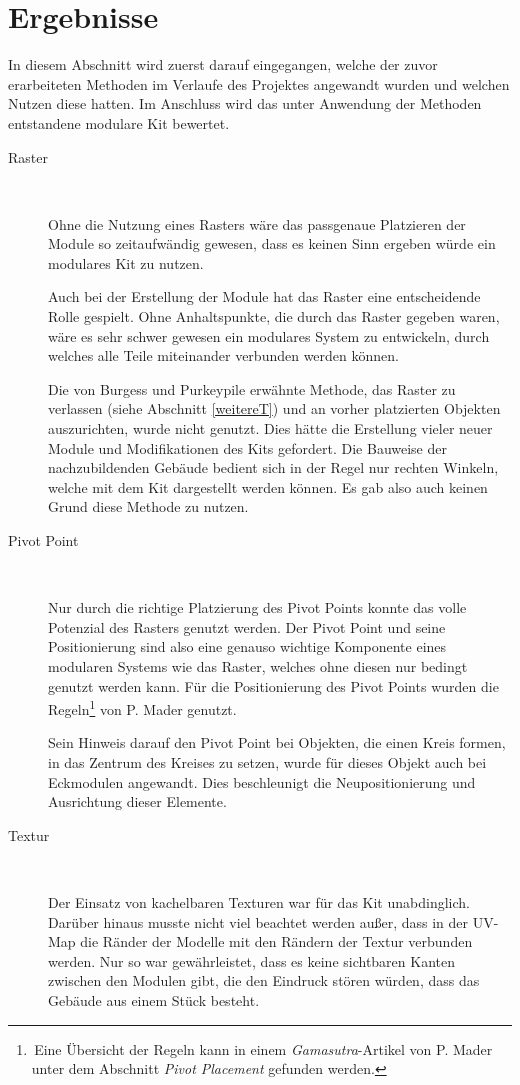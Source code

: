 \section{Ergebnisse}
In diesem Abschnitt wird zuerst darauf eingegangen, welche der zuvor erarbeiteten Methoden im Verlaufe des Projektes angewandt wurden und welchen Nutzen diese hatten. Im Anschluss wird das unter Anwendung der Methoden entstandene modulare Kit bewertet.
\begin{description}
\item[Raster]~\par
Ohne die Nutzung eines Rasters wäre das passgenaue Platzieren der Module so zeitaufwändig gewesen, dass es keinen Sinn ergeben würde ein modulares Kit zu nutzen.
\par
Auch bei der Erstellung der Module hat das Raster eine entscheidende Rolle gespielt. Ohne Anhaltspunkte, die durch das Raster gegeben waren, wäre es sehr schwer gewesen ein modulares System zu entwickeln, durch welches alle Teile miteinander verbunden werden können.
\par
Die von Burgess und Purkeypile erwähnte Methode, das Raster zu verlassen (siehe Abschnitt \ref{weitereT}) und an vorher platzierten Objekten auszurichten, wurde nicht genutzt. Dies hätte die Erstellung vieler neuer Module und Modifikationen  des Kits gefordert. Die Bauweise der nachzubildenden Gebäude bedient sich in der Regel nur rechten Winkeln, welche mit dem Kit dargestellt werden können. Es gab also auch keinen Grund diese Methode zu nutzen.
\item[Pivot Point]~\par
Nur durch die richtige Platzierung des Pivot Points konnte das volle Potenzial des Rasters genutzt werden. Der Pivot Point und seine Positionierung sind also eine genauso wichtige Komponente eines modularen Systems wie das Raster, welches ohne diesen nur bedingt genutzt werden kann. Für die Positionierung des Pivot Points wurden die Regeln\footnote{\,Eine Übersicht der Regeln kann in einem \textit{Gamasutra}-Artikel \parencite{Mader} von P. Mader unter dem Abschnitt \textit{Pivot Placement} gefunden werden.} von P. Mader genutzt.
\par
Sein Hinweis darauf den Pivot Point bei Objekten, die einen Kreis formen, in das Zentrum des Kreises zu setzen, wurde für dieses Objekt auch bei Eckmodulen angewandt. Dies beschleunigt die Neupositionierung und Ausrichtung dieser Elemente.
\item[Textur]~\par
Der Einsatz von kachelbaren Texturen war für das Kit unabdinglich. Darüber hinaus musste nicht viel beachtet werden außer, dass in der UV-Map die Ränder der Modelle mit den Rändern der Textur verbunden werden. Nur so war gewährleistet, dass es keine sichtbaren Kanten zwischen den Modulen gibt, die den Eindruck stören würden, dass das Gebäude aus einem Stück besteht.

\end{description}
